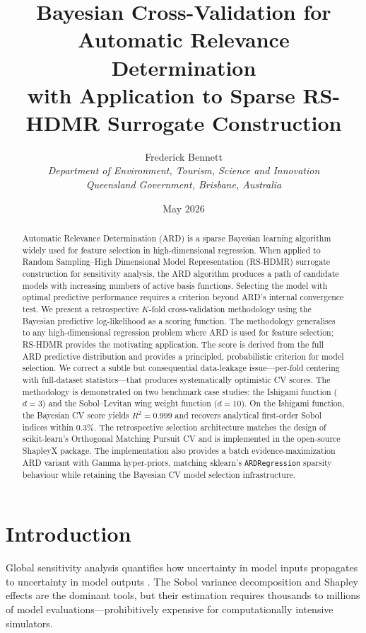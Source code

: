 \documentclass[11pt,a4paper]{article}
\title{Bayesian Cross-Validation for Automatic Relevance Determination\\with Application to Sparse RS-HDMR Surrogate Construction}
\author{Frederick Bennett\\
\textit{Department of Environment, Tourism, Science and Innovation}\\
\textit{Queensland Government, Brisbane, Australia}}
\date{May 2026}
\begin{document}
\maketitle

\begin{abstract}
Automatic Relevance Determination (ARD) is a sparse Bayesian learning algorithm widely used for feature selection in high-dimensional regression. When applied to Random Sampling--High Dimensional Model Representation (RS-HDMR) surrogate construction for sensitivity analysis, the ARD algorithm produces a path of candidate models with increasing numbers of active basis functions. Selecting the model with optimal predictive performance requires a criterion beyond ARD's internal convergence test. We present a retrospective $K$-fold cross-validation methodology using the Bayesian predictive log-likelihood as a scoring function. The methodology generalises to any high-dimensional regression problem where ARD is used for feature selection; RS-HDMR provides the motivating application. The score is derived from the full ARD predictive distribution and provides a principled, probabilistic criterion for model selection. We correct a subtle but consequential data-leakage issue---per-fold centering with full-dataset statistics---that produces systematically optimistic CV scores. The methodology is demonstrated on two benchmark case studies: the Ishigami function ($d=3$) and the Sobol--Levitan wing weight function ($d=10$). On the Ishigami function, the Bayesian CV score yields $R^2=0.999$ and recovers analytical first-order Sobol indices within $0.3\%$. The retrospective selection architecture matches the design of scikit-learn's Orthogonal Matching Pursuit CV and is implemented in the open-source ShapleyX package.  The implementation also provides a batch evidence-maximization ARD variant with Gamma hyper-priors, matching sklearn's \texttt{ARDRegression} sparsity behaviour while retaining the Bayesian CV model selection infrastructure.
\end{abstract}

\section{Introduction}

Global sensitivity analysis quantifies how uncertainty in model inputs propagates to uncertainty in model outputs \citep{saltelli2008}. The Sobol variance decomposition \citep{sobol2001} and Shapley effects \citep{owen2014,song2016} are the dominant tools, but their estimation requires thousands to millions of model evaluations---prohibitively expensive for computationally intensive simulators.
\end{document}
